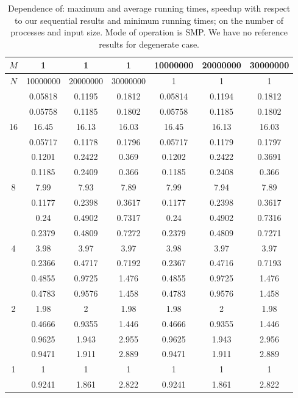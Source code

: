 \begin{table}[ht]
\centering
\begin{tabular}{c|c|c|c|c|c|c|}
\hline
$M$ & 1 & 1 & 1 & 10000000 & 20000000 & 30000000 \\
\hline
$N$ & 10000000 & 20000000 & 30000000 & 1 & 1 & 1 \\
\hline
 & 0.05818 & 0.1195 & 0.1812 & 0.05814 & 0.1194 & 0.1812 \\
 & 0.05758 & 0.1185 & 0.1802 & 0.05758 & 0.1185 & 0.1802 \\
16 & 16.45 & 16.13 & 16.03 & 16.45 & 16.13 & 16.03 \\
 & 0.05717 & 0.1178 & 0.1796 & 0.05717 & 0.1179 & 0.1797 \\
\hline
 & 0.1201 & 0.2422 & 0.369 & 0.1202 & 0.2422 & 0.3691 \\
 & 0.1185 & 0.2409 & 0.366 & 0.1185 & 0.2408 & 0.366 \\
8 & 7.99 & 7.93 & 7.89 & 7.99 & 7.94 & 7.89 \\
 & 0.1177 & 0.2398 & 0.3617 & 0.1177 & 0.2398 & 0.3617 \\
\hline
 & 0.24 & 0.4902 & 0.7317 & 0.24 & 0.4902 & 0.7316 \\
 & 0.2379 & 0.4809 & 0.7272 & 0.2379 & 0.4809 & 0.7271 \\
4 & 3.98 & 3.97 & 3.97 & 3.98 & 3.97 & 3.97 \\
 & 0.2366 & 0.4717 & 0.7192 & 0.2367 & 0.4716 & 0.7193 \\
\hline
 & 0.4855 & 0.9725 & 1.476 & 0.4855 & 0.9725 & 1.476 \\
 & 0.4783 & 0.9576 & 1.458 & 0.4783 & 0.9576 & 1.458 \\
2 & 1.98 & 2 & 1.98 & 1.98 & 2 & 1.98 \\
 & 0.4666 & 0.9355 & 1.446 & 0.4666 & 0.9355 & 1.446 \\
\hline
 & 0.9625 & 1.943 & 2.955 & 0.9625 & 1.943 & 2.956 \\
 & 0.9471 & 1.911 & 2.889 & 0.9471 & 1.911 & 2.889 \\
1 & 1 & 1 & 1 & 1 & 1 & 1 \\
 & 0.9241 & 1.861 & 2.822 & 0.9241 & 1.861 & 2.822 \\
\hline
\end{tabular}
\caption{Dependence of: maximum and average running times, speedup with respect to our sequential results and minimum running times; on the number of processes and input size. Mode of operation is SMP. We have no reference results for degenerate case.}
\end{table}


